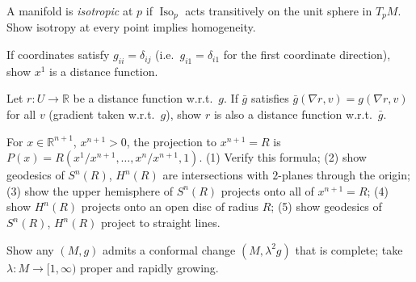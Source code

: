 \begin{remark}
  \label{rem:pet-ch5-ex-14}

  A manifold is \emph{isotropic} at $p$ if $\operatorname{Iso}_p$ acts transitively
  on the unit sphere in $T_pM$. Show isotropy at every point implies homogeneity.
\end{remark}

\begin{remark}
  \label{rem:pet-ch5-ex-15}

  If coordinates satisfy $g_{ii}=\delta_{ij}$ (i.e.\ $g_{i1}=\delta_{i1}$ for the
  first coordinate direction), show $x^1$ is a distance function.
\end{remark}

\begin{remark}
  \label{rem:pet-ch5-ex-16}

  Let $r:U\to\mathbb R$ be a distance function w.r.t.\ $g$. If $\bar g$ satisfies
  $\bar g(\nabla r,v)=g(\nabla r,v)$ for all $v$ (gradient taken w.r.t.\ $g$), show
  $r$ is also a distance function w.r.t.\ $\bar g$.
\end{remark}

\begin{remark}
  \label{rem:pet-ch5-ex-17}

  For $x\in\mathbb R^{n+1}$, $x^{n+1}>0$, the projection to $x^{n+1}=R$ is
  $P(x)=R(x^1/x^{n+1},\dots,x^n/x^{n+1},1)$. (1) Verify this formula; (2) show
  geodesics of $S^n(R)$, $H^n(R)$ are intersections with $2$-planes through the
  origin; (3) show the upper hemisphere of $S^n(R)$ projects onto all of
  $x^{n+1}=R$; (4) show $H^n(R)$ projects onto an open disc of radius $R$; (5) show
  geodesics of $S^n(R)$, $H^n(R)$ project to straight lines.
\end{remark}

\begin{remark}
  \label{rem:pet-ch5-ex-18}

  Show any $(M,g)$ admits a conformal change $(M,\lambda^2g)$ that is complete;
  take $\lambda:M\to[1,\infty)$ proper and rapidly growing.
\end{remark}

